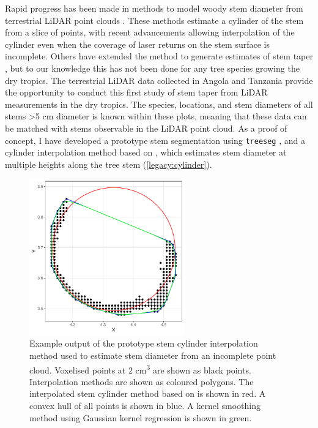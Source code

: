 \begin{refsection}
Rapid progress has been made in methods to model woody stem diameter from terrestrial LiDAR point clouds \citep{Bogdanovich2021, Hopkinson2004, Srinivasan2015, Ravaglia2019, Wang2016}. These methods estimate a cylinder of the stem from a slice of points, with recent advancements allowing interpolation of the cylinder even when the coverage of laser returns on the stem surface is incomplete. Others have extended the method to generate estimates of stem taper \citep{Henning2006, Thies2004}, but to our knowledge this has not been done for any tree species growing the dry tropics. The terrestrial LiDAR data collected in Angola and Tanzania provide the opportunity to conduct this first study of stem taper from LiDAR measurements in the dry tropics. The species, locations, and stem diameters of all stems >5 cm diameter is known within these plots, meaning that these data can be matched with stems observable in the LiDAR point cloud. As a proof of concept, I have developed a prototype stem segmentation using \texttt{treeseg} \citep{Burt2018}, and a cylinder interpolation method based on \citet{Umbach2003}, which estimates stem diameter at multiple heights along the tree stem (\autoref{legacy:cylinder}).

\begin{figure}[!h]
\centering
	\includegraphics[width=0.6\textwidth]{img/cylinder}
	\caption[Stem cross section cylinder interpolation to estimate stem diameter from terrestrial LiDAR]{Example output of the prototype stem cylinder interpolation method used to estimate stem diameter from an incomplete point cloud. Voxelised points at 2 cm\textsuperscript{3} are shown as black points. Interpolation methods are shown as coloured polygons. The interpolated stem cylinder method based on \citet{Umbach2003} is shown in red. A convex hull of all points is shown in blue. A kernel smoothing method using Gaussian kernel regression is shown in green.}
	\label{legacy:cylinder}
\end{figure}




\end{refsection}
